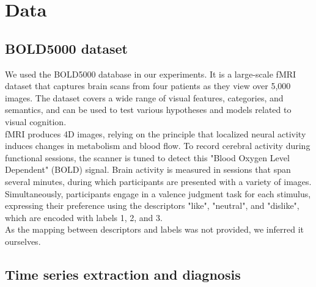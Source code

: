 \section{Data}

\subsection{BOLD5000 dataset}

We used the BOLD5000 database \cite{chang_bold5000_2019} in our experiments. It is a large-scale fMRI dataset that captures brain scans from four patients as they view over 5,000 images. The dataset covers a wide range of visual features, categories, and semantics, and can be used to test various hypotheses and models related to visual cognition. \\
fMRI produces 4D images, relying on the principle that localized neural activity induces changes in metabolism and blood flow.
To record cerebral activity during functional sessions, the scanner is tuned to detect this "Blood Oxygen Level Dependent" (BOLD) signal. 
Brain activity is measured in sessions that span several minutes, during which participants are presented with a variety of images. Simultaneously, participants engage in a valence judgment task for each stimulus, expressing their preference using the descriptors "like", "neutral", and "dislike", which are encoded with labels 1, 2, and 3.\\
As the mapping between descriptors and labels was not provided, we inferred it ourselves.

\subsection{Time series extraction and diagnosis}

